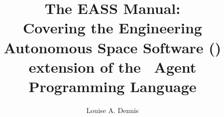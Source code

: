 \documentclass[a4]{book}
\author{Louise A. Dennis}
\title{The EASS Manual: \\
Covering the Engineering Autonomous Space Software (\eass) extension of the \gwendolen\ Agent Programming Language}
\begin{document}
\maketitle

\tableofcontents

\SetJava


% 
% 


\printindex
\end{document}
